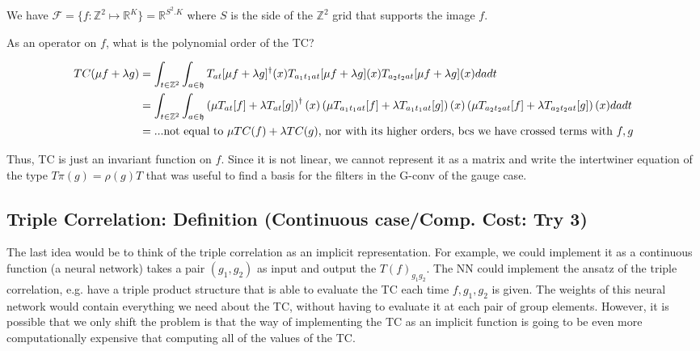 \documentclass{article}
\begin{document}
We have $\mathcal{F} = \{f:\mathbb{Z}^2 \mapsto \mathbb{R}^K \} = \mathbb{R}^{S^2.K} $ where $S$ is the side of the $\mathbb{Z}^2$ grid that supports the image $f$.

As an operator on $f$, what is the polynomial order of the TC?

\begin{align*}
    TC(\mu f+\lambda g)
    &= \int_{t \in \mathbb{Z}^2}
        \int_{a \in \mathfrak{h}}
            T_{at}[\mu f+\lambda g]^\dagger (x)
            T_{a_1t_1at}[\mu f+\lambda g](x)
            T_{a_2t_2at}[\mu f+\lambda g](x)
                dadt \\
    &= \int_{t \in \mathbb{Z}^2}
        \int_{a \in \mathfrak{h}}
            \left(\mu T_{at}[f] + \lambda T_{at}[g]\right)^\dagger (x)
            \left(\mu T_{a_1t_1at}[f] + \lambda T_{a_1t_1at}[g]\right) (x)
            \left(\mu T_{a_2t_2at}[f] + \lambda T_{a_2t_2at}[g]\right) (x)
                dadt \\
    &= ...\text{not equal to $ \mu TC(f) +\lambda TC(g)$, nor with its higher orders, bcs we have crossed terms with $f, g$}
\end{align*}

Thus, TC is just an invariant function on $f$. Since it is not linear, we cannot represent it as a matrix and write the intertwiner equation of the type $T \pi(g) = \rho(g) T$ that was useful to find a basis for the filters in the G-conv of the gauge case.

\subsection{Triple Correlation: Definition (Continuous case/Comp. Cost: Try 3)}

The last idea would be to think of the triple correlation as an implicit representation. For example, we could implement it as a continuous function (a neural network) takes a pair $(g_1, g_2)$ as input and output the $T(f)_{g_1g_2}$. The NN could implement the ansatz of the triple correlation, e.g. have a triple product structure that is able to evaluate the TC each time $f, g_1, g_2$ is given. The weights of this neural network would contain everything we need about the TC, without having to evaluate it at each pair of group elements. However, it is possible that we only shift the problem is that the way of implementing the TC as an implicit function is going to be even more computationally expensive that computing all of the values of the TC.
\end{document}
